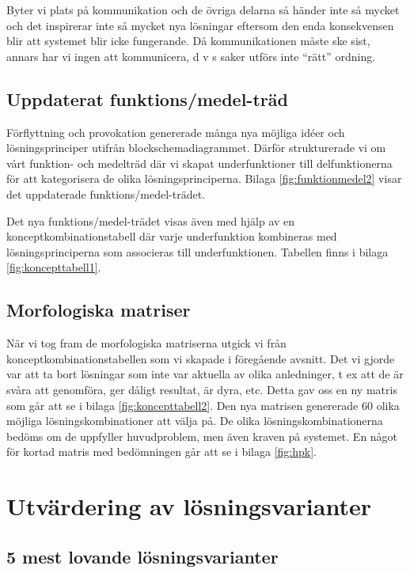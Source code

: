 \documentclass[11pt, a4paper]{report}
\begin{document}
Byter vi plats på kommunikation och de övriga delarna så händer inte så mycket och det inspirerar inte så mycket nya lösningar eftersom den enda konsekvensen blir att systemet blir icke fungerande. Då kommunikationen måste ske sist, annars har vi ingen att kommunicera, d v s saker utförs inte “rätt” ordning.


\subsection{Uppdaterat funktions/medel-träd}

Förflyttning och provokation genererade många nya möjliga idéer och lösningsprinciper utifrån blockschemadiagrammet. Därför strukturerade vi om vårt funktion- och medelträd där vi skapat underfunktioner till delfunktionerna för att kategorisera de olika lösningsprinciperna. Bilaga \ref{fig:funktionmedel2} visar det uppdaterade funktions/medel-trädet.

Det nya funktions/medel-trädet visas även med hjälp av en konceptkombinationstabell där varje underfunktion kombineras med lösningsprinciperna som associeras till underfunktionen. Tabellen finns i bilaga \ref{fig:koncepttabell1}.


\subsection{Morfologiska matriser}

När vi tog fram de morfologiska matriserna utgick vi från konceptkombinationstabellen som vi skapade i föregående avsnitt. Det vi gjorde var att ta bort lösningar som inte var aktuella av olika anledninger, t ex att de är svåra att genomföra, ger dåligt resultat, är dyra, etc. Detta gav oss en ny matris som går att se i bilaga \ref{fig:koncepttabell2}. Den nya matrisen genererade 60 olika möjliga lösningskombinationer att välja på. De olika lösningskombinationerna bedöms om de uppfyller huvudproblem, men även kraven på systemet. En något för kortad matris med bedömningen går att se i bilaga \ref{fig:hpk}.

\section{Utvärdering av lösningsvarianter}

\subsection{5 mest lovande lösningsvarianter}
\end{document}
